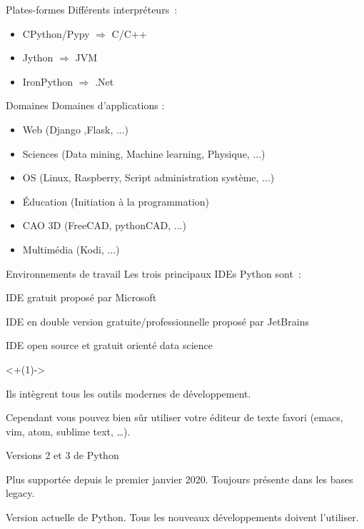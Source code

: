 \begin{frame}{Plates-formes}
  Différents interpréteurs~:
  \begin{itemize}
  \item CPython/Pypy $\Rightarrow$ C/C++
  \item Jython $\Rightarrow$ JVM
  \item IronPython $\Rightarrow$ .Net
  \end{itemize}
\end{frame}

\begin{frame}{Domaines}
  Domaines d'applications :
  \begin{itemize}
  \item Web (Django ,Flask, ...)
  \item Sciences (Data mining, Machine learning, Physique, ...)
  \item OS (Linux, Raspberry, Script administration système, ...)
  \item Éducation (Initiation à la programmation)
  \item CAO 3D (FreeCAD, pythonCAD, ...)
  \item Multimédia (Kodi, ...)
  \end{itemize}
\end{frame}

\begin{frame}{Environnements de travail}
  Les trois principaux IDEs Python sont~:

  \begin{description}[<+(1)->]
    \item[Visual Studio Code] IDE gratuit proposé par Microsoft
    \item[PyCharm] IDE en double version gratuite/professionnelle proposé par JetBrains
    \item[Spyder] IDE open source et gratuit orienté data science
  \end{description}

  \onslide<+(1)->{
    Ils intègrent tous les outils modernes de développement.

    Cependant vous pouvez bien sûr utiliser votre éditeur de texte favori (emacs, vim, atom, sublime text, …).
  }
\end{frame}

\begin{frame}{Versions 2 et 3 de Python}
  \begin{description}[<+->]
    \item[Version 2] Plus supportée depuis le premier janvier 2020. Toujours présente dans les bases legacy.
    \item[Version 3] Version actuelle de Python. Tous les nouveaux développements doivent l'utiliser.
  \end{description}
\end{frame}

